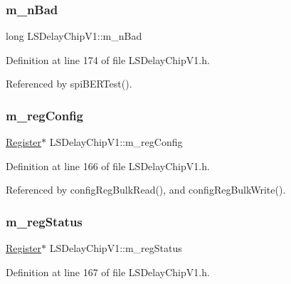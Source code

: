 \subsubsection{\texorpdfstring{m\+\_\+n\+Bad}{m\_nBad}}
{\footnotesize\ttfamily long L\+S\+Delay\+Chip\+V1\+::m\+\_\+n\+Bad\hspace{0.3cm}{\ttfamily [private]}}



Definition at line 174 of file L\+S\+Delay\+Chip\+V1.\+h.



Referenced by spi\+B\+E\+R\+Test().

\mbox{\label{classLSDelayChipV1_afd1cfdcb114549dc1466c77f07d39fe0}} 
\subsubsection{\texorpdfstring{m\+\_\+reg\+Config}{m\_regConfig}}
{\footnotesize\ttfamily \hyperlink{classRegister}{Register}$\ast$ L\+S\+Delay\+Chip\+V1\+::m\+\_\+reg\+Config\hspace{0.3cm}{\ttfamily [private]}}



Definition at line 166 of file L\+S\+Delay\+Chip\+V1.\+h.



Referenced by config\+Reg\+Bulk\+Read(), and config\+Reg\+Bulk\+Write().

\mbox{\label{classLSDelayChipV1_aaf118f103e89a35d2c449e8e3ffe8c20}} 
\subsubsection{\texorpdfstring{m\+\_\+reg\+Status}{m\_regStatus}}
{\footnotesize\ttfamily \hyperlink{classRegister}{Register}$\ast$ L\+S\+Delay\+Chip\+V1\+::m\+\_\+reg\+Status\hspace{0.3cm}{\ttfamily [private]}}



Definition at line 167 of file L\+S\+Delay\+Chip\+V1.\+h.

